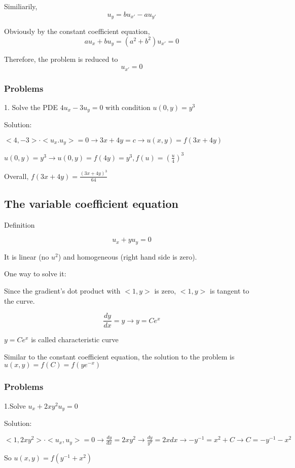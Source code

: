 \documentclass{article}
\begin{document}
Similiarily,
$$u_y = bu_{x'} - a u_{y'}$$

Obviously by the constant coefficient equation,
$$au_x+bu_y=(a^2+b^2)u_{x'} = 0$$

Therefore, the problem is reduced to 
$$u_{x'} = 0$$

\subsubsection{Problems}
1. Solve the PDE $4u_x - 3 u_y = 0$ with condition $u(0,y) = y^3$

Solution:

$<4,-3> \cdot <u_x.u_y> = 0 \rightarrow 3x+4y = c \rightarrow u(x,y) = f(3x+4y)$ 

$u(0,y) = y^3 \rightarrow u(0,y) = f(4y)=y^3,f(u)=(\frac{u}{4})^3$

Overall, $f(3x+4y) = \frac{(3x+4y)^3}{64}$

\subsection{The variable coefficient equation}
Definition

\begin{equation} \label{eq2}
u_x+yu_y =0
\end{equation}


It is linear (no $u^2$) and homogeneous (right hand side is zero).

One way to solve it:

Since the gradient's dot product with $<1,y>$ is zero, $<1,y>$ is tangent to the curve. 

$$\frac{dy}{dx} = y \rightarrow y = Ce^x$$

$y = Ce^x$ is called characteristic curve

Similar to the constant coefficient equation, the solution to the problem is $u(x,y) = f(C) = f(ye^{-x})$

\subsubsection{Problems}

1.Solve $u_x+2xy^2u_y=0$

Solution:

$<1,2xy^2> \cdot <u_x,u_y>=0 \rightarrow \frac{dy}{dx} = 2xy^2 \rightarrow \frac{dy}{y^2} = 2x dx \rightarrow -y^{-1} = x^2 + C \rightarrow C = -y^{-1}-x^2$

So $u(x,y) = f(y^{-1}+x^2)$
\end{document}
